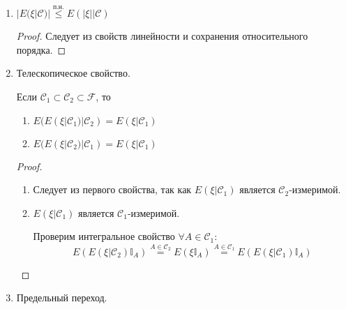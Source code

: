 \begin{enumerate}
	      Если $\xi \leq \eta$, то $E(\xi | \mathcal{C}) \stackrel{\text{п.н.}}{\leq} E(\eta | \mathcal{C})$
	      \begin{proof}
		      Рассмотрим
		      \[\forall A \in \mathcal{C}:\: \xi\mathbb{I}_A \leq \eta\mathbb{I}_A \Rightarrow E(E(\xi|\mathcal{C})\mathbb{I}_A) = E(\xi\mathbb{I}_A) \leq E(\eta\mathbb{I}_A) = E(E(\eta | \mathcal{C})\mathbb{I}_A)\]
	      \end{proof}
	      Раз $E(\xi | \mathcal{C})$ и $E(\eta | \mathcal{C})$ являются $\mathcal{C}$-измеримыми, то по свойству обычного матожидания
	      \[E(\xi | \mathcal{C}) \stackrel{\text{п.н.}}{\leq} E(\eta | \mathcal{C})\]
	\item $|E(\xi | \mathcal{C})| \stackrel{\text{п.н.}}{\leq} E(|\xi| | \mathcal{C})$
	      \begin{proof}
		      Следует из свойств линейности и сохранения относительного порядка.
	      \end{proof}
	\item Телескопическое свойство.

	      Если $\mathcal{C}_1 \subset \mathcal{C}_2 \subset \mathcal{F}$, то
	      \begin{enumerate}
		      \item $E(E(\xi | \mathcal{C}_1) | \mathcal{C}_2) = E(\xi | \mathcal{C}_1)$
		      \item $E(E(\xi | \mathcal{C}_2) | \mathcal{C}_1) = E(\xi | \mathcal{C}_1)$
	      \end{enumerate}
	      \begin{proof}
		      \begin{enumerate}
			      \item Следует из первого свойства, так как $E(\xi | \mathcal{C_1})$ является $\mathcal{C}_2$-измеримой.
			      \item $E(\xi | \mathcal{C}_1)$ является $\mathcal{C}_1$-измеримой.

			            Проверим интегральное свойство $\forall A \in \mathcal{C}_1$:
			            \[E(E(\xi | \mathcal{C}_2)\mathbb{I}_A) \stackrel{A \in \mathcal{C}_2}{=} E(\xi\mathbb{I}_A) \stackrel{A \in \mathcal{C}_1}{=} E(E(\xi | \mathcal{C}_1)\mathbb{I}_A)\]
		      \end{enumerate}
	      \end{proof}
	\item Предельный переход.


\end{enumerate}
